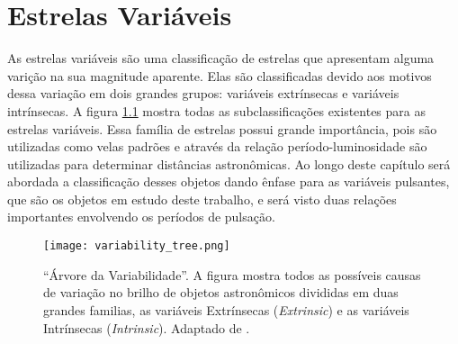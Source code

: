 \chapter{Estrelas Variáveis}
\label{cap:estrelas}

\nocite{Catelan_book}

As estrelas variáveis são uma classificação de estrelas que apresentam alguma varição na sua magnitude aparente. Elas são classificadas devido aos motivos dessa variação em dois grandes grupos: variáveis extrínsecas e variáveis intrínsecas.  A figura \ref{fig:arvore_variab} mostra todas as subclassificações existentes para as estrelas variáveis. Essa família de estrelas possui grande importância, pois são utilizadas como velas padrões e através da relação período-luminosidade são utilizadas para determinar distâncias astronômicas. Ao longo deste capítulo será abordada a classificação desses objetos dando ênfase para as variáveis pulsantes, que são os objetos em estudo deste trabalho, e será visto duas relações importantes envolvendo os períodos de pulsação.%

\begin{figure}[!ht]
\centering
\texttt{[image: variability\_tree.png]}
\caption[Árvore da Variabilidade]{``Árvore da Variabilidade''. A figura mostra todos as possíveis causas de variação no brilho de objetos astronômicos divididas em duas grandes familias, as variáveis Extrínsecas (\textit{Extrinsic}) e as variáveis Intrínsecas (\textit{Intrinsic}). Adaptado de \citet{Catelan_book}.}
\label{fig:arvore_variab}
\end{figure}


